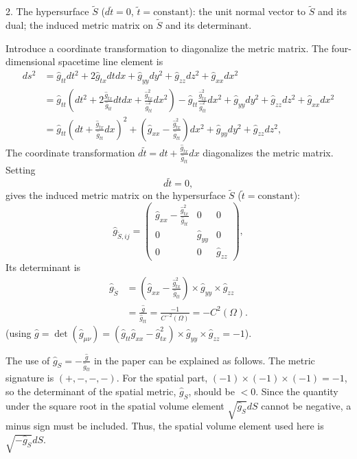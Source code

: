 \documentclass[english]{article}
\begin{document}
2. The hypersurface $\tilde{S}$ ($d\tilde{t}=0$, $\tilde{t}=\text{constant}$):
the unit normal vector to $\tilde{S}$ and its dual; the induced metric
matrix on $\tilde{S}$ and its determinant.

Introduce a coordinate transformation to diagonalize the metric matrix.
The four-dimensional spacetime line element is 
\begin{align*}
ds^{2} & =\hat{g}_{tt}dt^{2}+2\hat{g}_{tx}dtdx+\hat{g}_{yy}dy^{2}+\hat{g}_{zz}dz^{2}+\hat{g}_{xx}dx^{2}\\
 & =\hat{g}_{tt}\left(dt^{2}+2\frac{\hat{g}_{tx}}{\hat{g}_{tt}}dtdx+\frac{\hat{g}^{2}_{tx}}{\hat{g}^{2}_{tt}}dx^{2}\right)-\hat{g}_{tt}\frac{\hat{g}^{2}_{tx}}{\hat{g}^{2}_{tt}}dx^{2}+\hat{g}_{yy}dy^{2}+\hat{g}_{zz}dz^{2}+\hat{g}_{xx}dx^{2}\\
 & =\hat{g}_{tt}\left(dt+\frac{\hat{g}_{tx}}{\hat{g}_{tt}}dx\right)^{2}+\left(\hat{g}_{xx}-\frac{\hat{g}^{2}_{tx}}{\hat{g}_{tt}}\right)dx^{2}+\hat{g}_{yy}dy^{2}+\hat{g}_{zz}dz^{2},
\end{align*}
 The coordinate transformation $d\tilde{t}=dt+\frac{\hat{g}_{tx}}{\hat{g}_{tt}}dx$
diagonalizes the metric matrix. Setting 
\[
d\tilde{t}=0,
\]
 gives the induced metric matrix on the hypersurface $\tilde{S}$
($\tilde{t}=\text{constant}$): 
\[
\hat{g}_{\tilde{S},ij}=\begin{pmatrix}\hat{g}_{xx}-\frac{\hat{g}^{2}_{tx}}{\hat{g}_{tt}} & 0 & 0\\
0 & \hat{g}_{yy} & 0\\
0 & 0 & \hat{g}_{zz}
\end{pmatrix},
\]
 Its determinant is 
\begin{align*}
\hat{g}_{\tilde{S}} & =\left(\hat{g}_{xx}-\frac{\hat{g}^{2}_{tx}}{\hat{g}_{tt}}\right)\times\hat{g}_{yy}\times\hat{g}_{zz}\\
 & =\frac{\hat{g}}{\hat{g}_{tt}}=\frac{-1}{C^{-2}\left(\Omega\right)}=-C^{2}\left(\Omega\right).
\end{align*}
 (using $\hat{g}=\det\left(\hat{g}_{\mu\nu}\right)=\left(\hat{g}_{tt}\hat{g}_{xx}-\hat{g}^{2}_{tx}\right)\times\hat{g}_{yy}\times\hat{g}_{zz}=-1$).

The use of $\hat{g}_{S}=-\frac{\hat{g}}{\hat{g}_{tt}}$ in the paper
can be explained as follows. The metric signature is $(+,-,-,-)$.
For the spatial part, $\left(-1\right)\times\left(-1\right)\times\left(-1\right)=-1$,
so the determinant of the spatial metric, $\hat{g}_{S}$, should be
$<0$. Since the quantity under the square root in the spatial volume
element $\sqrt{\hat{g}_{S}}dS$ cannot be negative, a minus sign must
be included. Thus, the spatial volume element used here is $\sqrt{-\hat{g}_{S}}dS$.
\end{document}
